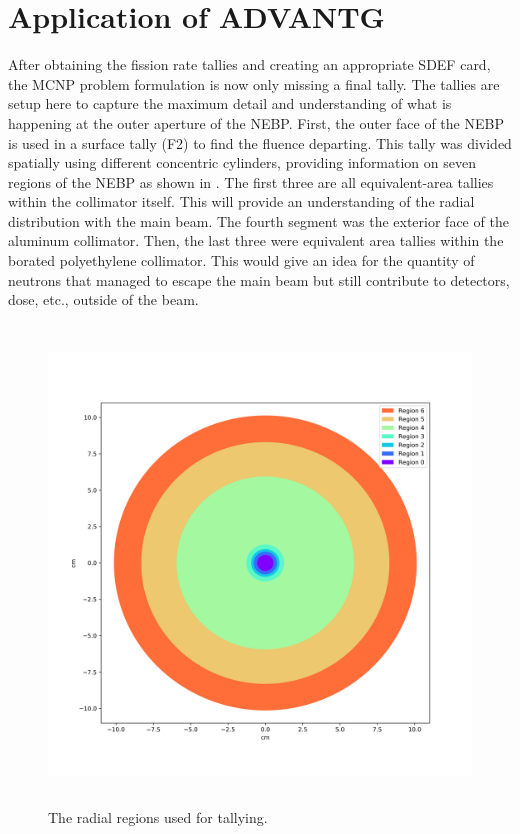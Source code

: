 \section{Application of ADVANTG}

After obtaining the fission rate tallies and creating an appropriate SDEF card, the MCNP problem formulation is now only missing a final tally.
The tallies are setup here to capture the maximum detail and understanding of what is happening at the outer aperture of the NEBP.
First, the outer face of the NEBP is used in a surface tally (F2) to find the fluence departing.
This tally was divided spatially using different concentric cylinders, providing information on seven regions of the NEBP as shown in .
The first three are all equivalent-area tallies within the collimator itself.
This will provide an understanding of the radial distribution with the main beam.
The fourth segment was the exterior face of the aluminum collimator.
Then, the last three were equivalent area tallies within the borated polyethylene collimator.
This would give an idea for the quantity of neutrons that managed to escape the main beam but still contribute to detectors, dose, etc., outside of the beam.

\begin{figure}[htb]
\centering
\includegraphics[height=5in]{tex/figures/region_diagram.png}
\caption[Tally Region Diagram]{The radial regions used for tallying.}
\label{fig:region_diagram}
\end{figure}

